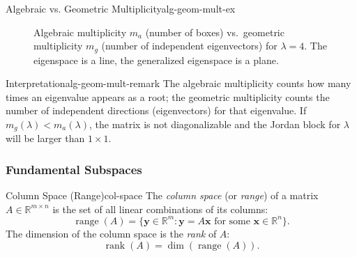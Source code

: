 \begin{example}{Algebraic vs. Geometric Multiplicity}{alg-geom-mult-ex}
\begin{figure}[H]
        \caption{Algebraic multiplicity \(m_a\) (number of boxes) vs.\ geometric multiplicity \(m_g\) (number of independent eigenvectors) for \(\lambda=4\). The eigenspace is a line, the generalized eigenspace is a plane.}
    \end{figure}

\end{example}

\begin{remark}{Interpretation}{alg-geom-mult-remark}
    The algebraic multiplicity counts how many times an eigenvalue appears as a root; the geometric multiplicity counts the number of independent directions (eigenvectors) for that eigenvalue. If \(m_g(\lambda) < m_a(\lambda)\), the matrix is not diagonalizable and the Jordan block for \(\lambda\) will be larger than \(1 \times 1\).
\end{remark}


\subsubsection{Fundamental Subspaces}
\begin{definition}{Column Space (Range)}{col-space}
    The \emph{column space} (or \emph{range}) of a matrix \(A\in\mathbb{R}^{m\times n}\) is the set of all linear combinations of its columns:
    \[
        \operatorname{range}(A) = \{\mathbf{y} \in \mathbb{R}^m : \mathbf{y} = A\mathbf{x} \text{ for some } \mathbf{x} \in \mathbb{R}^n\}.
    \]
    The dimension of the column space is the \emph{rank} of \(A\):
    \[
        \operatorname{rank}(A) = \dim(\operatorname{range}(A)).
    \]
\end{definition}

